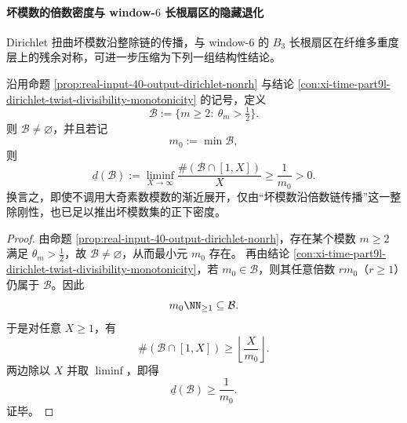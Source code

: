 \paragraph{坏模数的倍数密度与 window-\texorpdfstring{$6$}{6} 长根扇区的隐藏退化}
Dirichlet 扭曲坏模数沿整除链的传播，与 window-\(6\) 的 \(B_3\) 长根扇区在纤维多重度层上的残余对称，可进一步压缩为下列一组结构性结论。

\begin{corollary}[整除传播单独强迫坏模数集具有正下密度]\label{cor:xi-dirichlet-bad-moduli-positive-lower-density-by-divisibility}
沿用命题 \ref{prop:real-input-40-output-dirichlet-nonrh} 与结论 \ref{con:xi-time-part9l-dirichlet-twist-divisibility-monotonicity} 的记号，定义
\[
\mathcal B:=\{m\ge 2:\ \theta_m>\tfrac12\}.
\]
则 \(\mathcal B\neq\varnothing\)，并且若记
\[
m_0:=\min \mathcal B,
\]
则
\[
\underline d(\mathcal B)
:=
\liminf_{X\to\infty}\frac{\#(\mathcal B\cap [1,X])}{X}
\ge
\frac{1}{m_0}
>
0.
\]
换言之，即使不调用大奇素数模数的渐近展开，仅由“坏模数沿倍数链传播”这一整除刚性，也已足以推出坏模数集的正下密度。
\end{corollary}
\begin{proof}
由命题 \ref{prop:real-input-40-output-dirichlet-nonrh}，存在某个模数 \(m\ge 2\) 满足 \(\theta_m>\tfrac12\)，故 \(\mathcal B\neq\varnothing\)，从而最小元 \(m_0\) 存在。
再由结论 \ref{con:xi-time-part9l-dirichlet-twist-divisibility-monotonicity}，若 \(m_0\in\mathcal B\)，则其任意倍数 \(rm_0\)（\(r\ge 1\)）仍属于 \(\mathcal B\)。因此
\[
m_0\NN_{\ge 1}\subseteq \mathcal B.
\]
于是对任意 \(X\ge 1\)，有
\[
\#(\mathcal B\cap [1,X])\ge \left\lfloor \frac{X}{m_0}\right\rfloor.
\]
两边除以 \(X\) 并取 \(\liminf\)，即得
\[
\underline d(\mathcal B)\ge \frac{1}{m_0}.
\]
证毕。
\end{proof}

